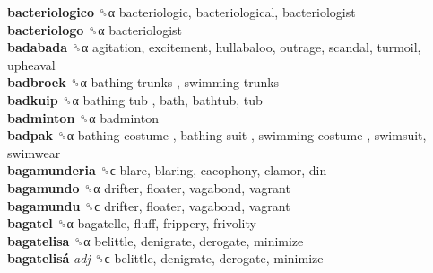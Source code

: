 \textbf{bacteriologico} ␝α  bacteriologic, bacteriological, bacteriologist  \\
\textbf{bacteriologo} ␝α  bacteriologist  \\
\textbf{badabada} ␝α  agitation, excitement, hullabaloo, outrage, scandal, turmoil, upheaval  \\
\textbf{badbroek} ␝α   bathing trunks ,  swimming trunks   \\
\textbf{badkuip} ␝α   bathing tub , bath, bathtub, tub  \\
\textbf{badminton} ␝α  badminton  \\
\textbf{badpak} ␝α   bathing costume ,  bathing suit ,  swimming costume , swimsuit, swimwear  \\
\textbf{bagamunderia} ␝ϲ  blare, blaring, cacophony, clamor, din  \\
\textbf{bagamundo} ␝α  drifter, floater, vagabond, vagrant  \\
\textbf{bagamundu} ␝ϲ  drifter, floater, vagabond, vagrant  \\
\textbf{bagatel} ␝α  bagatelle, fluff, frippery, frivolity  \\
\textbf{bagatelisa} ␝α  belittle, denigrate, derogate, minimize  \\
\textbf{bagatelisá} \emph{adj}  ␝ϲ  belittle, denigrate, derogate, minimize  \\
